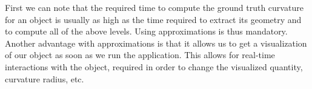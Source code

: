 \documentclass{llncs}
\begin{document}

First we can note that the required time to
compute the ground truth curvature for an object is usually as high as the time
required to extract its geometry and to compute all of the above
levels. Using approximations is thus mandatory.  Another advantage
with approximations is that it allows us to get a visualization of
our object as soon as we run the application. This allows for
real-time interactions with the object, required in order to change
the visualized quantity, curvature radius, etc.
\end{document}
